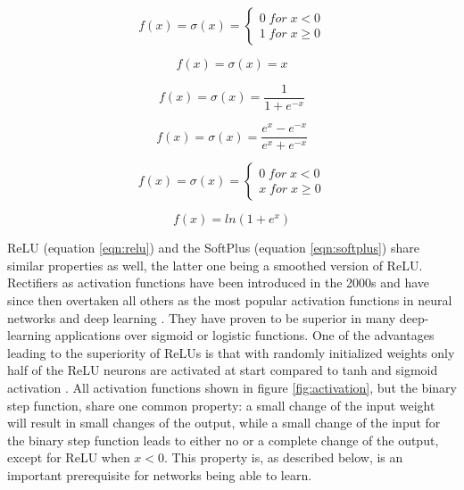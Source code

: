 \begin{equation}
 f(x)= \sigma(x) = \left\{
 \begin{array}{ll}
 0 \; for \; x < 0 \\ 
 1 \; for \; x \geq 0
 \end{array}
\right .
\label{eqn:binary}
\end{equation}

\begin{equation}
 f(x) = \sigma(x) = x
 \label{eqn:ident}
\end{equation}
    
\begin{equation}
 f(x) = \sigma(x) = \frac{1}{1+e^{-x}} 
 \label{eqn:sigmoid}
\end{equation}

\begin{equation}
 f(x) = \sigma(x) = \frac{e^x - e^{-x}}{e^x + e^{-x}}
 \label{eqn:tanh}
\end{equation}

\begin{equation}
 f(x)= \sigma(x) = \left\{
 \begin{array}{ll}
 0 \; for \; x < 0 \\ 
 x \; for \; x \geq 0
 \end{array}
\right .
\label{eqn:relu}
\end{equation}

\begin{equation}
 f(x) = ln(1+e^x)
 \label{eqn:softplus}
\end{equation}


ReLU (equation \ref{eqn:relu}) and the SoftPlus (equation \ref{eqn:softplus}) share
similar properties as well, the latter one being a smoothed version of ReLU. Rectifiers as
activation functions have been introduced in the 2000s \cite{hahnloser2000digital} and
have since then overtaken all others as the most popular activation functions in neural
networks and deep learning \cite{lecun2015deep}. They have proven to be superior in many
deep-learning applications over sigmoid or logistic functions. One of the advantages
leading to the superiority of ReLUs is that with randomly initialized weights only half of
the ReLU neurons are activated at start compared to tanh and sigmoid activation
\cite{glorot2011deep}. All activation functions shown in figure \ref{fig:activation}, but
the binary step function, share one common property: a small change of the input weight
will result in small changes of the output, while a small change of the input for the
binary step function leads to either no or a complete change of the output, except for
ReLU when
$x<0$. This property is, as described below, is an important prerequisite for networks being able to learn. \\

